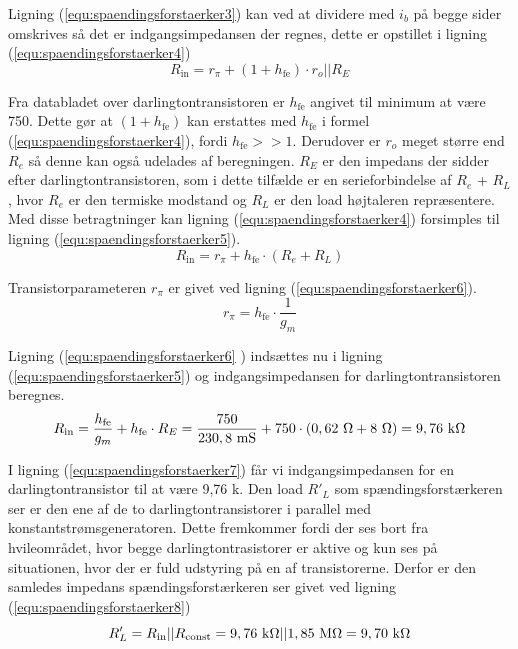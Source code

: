 Ligning (\ref{equ:spaendingsforstaerker3}) kan ved at dividere med $i_b$ på begge sider omskrives så det er indgangsimpedansen der regnes, dette er opstillet i ligning (\ref{equ:spaendingsforstaerker4})
\begin{equation}
\label{equ:spaendingsforstaerker4}
R_{\mathrm{in}} = r_{\pi} + (1+h_{\mathrm{fe}}) \cdot r_o||R_E 
\end{equation}

Fra databladet over darlingtontransistoren er $h_{\mathrm{fe}}$ angivet til minimum at være 750. Dette gør at  $(1+h_{\mathrm{fe}})$ kan erstattes med $h_{\mathrm{fe}}$ i formel (\ref{equ:spaendingsforstaerker4}), fordi $h_{\mathrm{fe}} >> 1$. Derudover er $r_o$ meget større end $R_e$ så denne kan også udelades af beregningen. $R_E$ er den impedans der sidder efter darlingtontransistoren, som i dette tilfælde er en serieforbindelse af $R_e$ + $R_L$, hvor $R_e$ er den termiske modstand og $R_L$ er den load højtaleren repræsentere. Med disse betragtninger kan ligning (\ref{equ:spaendingsforstaerker4}) forsimples til ligning (\ref{equ:spaendingsforstaerker5}).
\begin{equation}
\label{equ:spaendingsforstaerker5}
R_{\mathrm{in}} = r_{\pi} + h_{\mathrm{fe}} \cdot (R_e + R_L)
\end{equation}

Transistorparameteren $r_{\pi}$ er givet ved ligning (\ref{equ:spaendingsforstaerker6}).
\begin{equation}
\label{equ:spaendingsforstaerker6}
r_{\pi} = h_{\mathrm{fe}} \cdot \frac{1}{g_m}
\end{equation}

Ligning (\ref{equ:spaendingsforstaerker6} ) indsættes nu i ligning (\ref{equ:spaendingsforstaerker5}) og indgangsimpedansen for darlingtontransistoren beregnes.
\begin{equation}
\label{equ:spaendingsforstaerker7}
R_{\mathrm{in}} = \frac{h_{\mathrm{fe}}}{g_m} + h_{\mathrm{fe}} \cdot R_E = \frac{750}{230,8~\mathrm{mS}} + 750 \cdot (0,62~\ohm + 8~\ohm) = 9,76~\mathrm{k}\ohm  
\end{equation}

I ligning (\ref{equ:spaendingsforstaerker7}) får vi indgangsimpedansen for en darlingtontransistor til at være 9,76 k\ohm. Den load $R'_L$ som spændingsforstærkeren ser er den ene af de to darlingtontransistorer i parallel med konstantstrømsgeneratoren. Dette fremkommer fordi der ses bort fra hvileområdet, hvor begge darlingtontrasistorer er aktive og kun ses på situationen, hvor der er fuld udstyring på en af transistorerne. Derfor er den samledes impedans spændingsforstærkeren ser givet ved ligning (\ref{equ:spaendingsforstaerker8})
\begin{equation}
\label{equ:spaendingsforstaerker8}
R'_L = R_{\mathrm{in}}||R_{\mathrm{const}} = 9,76~\mathrm{k}\ohm||1,85~\mathrm{M}\ohm = 9,70~\mathrm{k}\ohm
\end{equation}  

